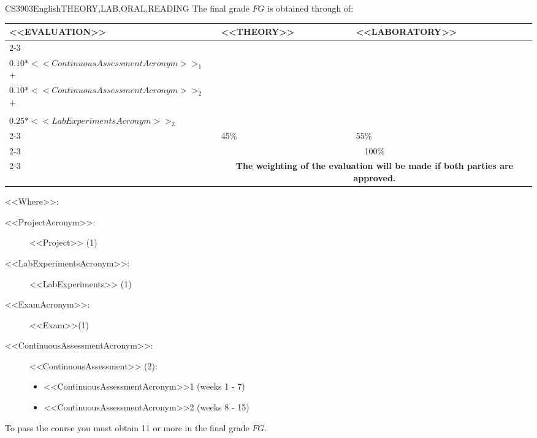   \begin{evaluation}{CS3903}{English}{THEORY,LAB,ORAL,READING}
  The final grade $FG$ is obtained through of:
 
  \begin{tabularx}{0.9\textwidth}{|X|p{}|p{}|} \hline
  \multirow{4}{*}{\uppercase{<<Evaluation>>}} & \uppercase{<<Theory>>} & \uppercase{<<Laboratory>>} \\ \cline{2-3}
  & %
      \begin{minipage}{0.95\textwidth}
      \begin{tabular}{l}
        $0.25*<<ExamAcronym>>$ + \\
        $0.10*<<ContinuousAssessmentAcronym>>_{1}$  + \\
        $0.10*<<ContinuousAssessmentAcronym>>_{2}$  + \\
      \end{tabular} 
      \end{minipage} 
  & %
      \begin{minipage}{0.95\textwidth}
      \begin{tabular}{l}
        $0.30*<<ProjectAcronym>>_{1}$  + \\
        $0.25*<<LabExperimentsAcronym>>_{2}$  
      \end{tabular} 
      \end{minipage}                 \\ \cline{2-3}
  
  & %
  45\% 
  & %
  55\% \\ \cline{2-3}
  & \multicolumn{2}{c|}{100\%}  \\ \cline{2-3}
  & \multicolumn{2}{c|}{\textbf{The weighting of the evaluation will be made if both parties are approved.}}  \\ \hline
  \end{tabularx}
    
  \vspace{2mm}
  \noindent <<Where>>:
  \begin{description}
    \item[<<ProjectAcronym>>:]  <<Project>> (1)
    \item[<<LabExperimentsAcronym>>:] <<LabExperiments>> (1)
    \item[<<ExamAcronym>>:] <<Exam>>(1)
    \item[<<ContinuousAssessmentAcronym>>:] <<ContinuousAssessment>> (2):
      \begin{itemize}
          \item  <<ContinuousAssessmentAcronym>>1 (weeks 1 - 7)
          \item <<ContinuousAssessmentAcronym>>2 (weeks 8 - 15) 
      \end{itemize}
  \end{description}
 
  \noindent To pass the course you must obtain 11 or more in the final grade $FG$.
  \end{evaluation}


